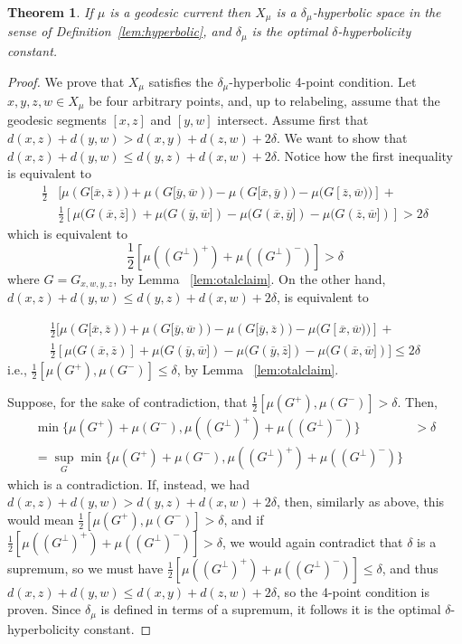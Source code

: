 \documentclass[12pt,article]{amsart}
\numberwithin{equation}{section}
\numberwithin{figure}{section}
\newtheorem{theorem}[equation]{Theorem}
\theoremstyle{definition}
\theoremstyle{plain}
\begin{document}
\begin{theorem}
If $\mu$ is a geodesic current then $X_{\mu}$ is a $\delta_{\mu}$-hyperbolic space in the sense of Definition~\ref{lem:hyperbolic}, and $\delta_{\mu}$ is the optimal $\delta$-hyperbolicity constant.
\label{prop:dualishyp}
\end{theorem}
\begin{proof}
We prove that $X_{\mu}$ satisfies the $\delta_{\mu}$-hyperbolic 4-point condition.
Let $x,y,z,w \in X_{\mu}$ be four arbitrary points, and, up to relabeling, assume that the geodesic segments $[x,z]$ and $[y,w]$ intersect. 
Assume first that $d(x,z) + d(y,w) > d(x,y) + d(z,w)+2\delta$. We want to show that $d(x,z) + d(y,w) \leq d(y,z) + d(x,w)+2\delta$.
Notice how the first inequality is equivalent to 
\begin{align*} 
\frac{1}{2} & [\mu (G[\overline{x},\overline{z})) + \mu(G[\overline{y},\overline{w}))- \mu(G[\overline{x},\overline{y})) - \mu(G[\overline{z},\overline{w})) ] + \\
& \frac{1}{2} [\mu (G(\overline{x},\overline{z}]) + \mu(G(\overline{y},\overline{w}])- \mu(G(\overline{x},\overline{y}]) - \mu(G(\overline{z},\overline{w}]) ] > 2 \delta
\end{align*}
which is equivalent to
\[
\frac{1}{2} [\mu((G^{\perp})^+) + \mu((G^{\perp})^-) ] > \delta
\]
where $G=G_{x,w,y,z}$, by Lemma ~\ref{lem:otalclaim}.
On the other hand, $d(x,z) + d(y,w) \leq d(y,z) + d(x,w)+2\delta$, is equivalent to

\begin{align*}
\frac{1}{2} [ \mu (G[\overline{x},\overline{z})) + \mu(G[\overline{y},\overline{w}))- \mu(G[\overline{y},\overline{z})) - \mu(G[\overline{x},\overline{w})) ] + \\
\frac{1}{2} [ \mu (G(\overline{x},\overline{z})] + \mu(G(\overline{y},\overline{w}])- \mu(G(\overline{y},\overline{z}]) - \mu(G(\overline{x},\overline{w}]) ] \leq  2 \delta
\end{align*}
 i.e., $\frac{1}{2} [ \mu (G^+), \mu (G^-) ] \leq \delta$, by Lemma ~\ref{lem:otalclaim}.

Suppose, for the sake of contradiction, that  $\frac{1}{2} [ \mu (G^+), \mu (G^-) ] >  \delta$. Then, 
\begin{align*}
\min \{ \mu(G^+) + \mu(G^-), \mu((G^{\perp})^+) + \mu((G^{\perp})^-)\} & > \delta \\
= \sup_G \min \{ \mu(G^+) + \mu(G^-), \mu((G^{\perp})^+) + \mu((G^{\perp})^-)\} 
\end{align*}
which is a contradiction.
If, instead, we had $d(x,z) + d(y,w) > d(y,z) + d(x,w)+2\delta$, then, similarly as above, this would mean $\frac{1}{2} [ \mu (G^+), \mu (G^-) ] > \delta$, and if $\frac{1}{2} [\mu((G^{\perp})^+) + \mu((G^{\perp})^-) ]>\delta$, we would again contradict that $\delta$ is a supremum, so we must have $\frac{1}{2} [\mu((G^{\perp})^+) + \mu((G^{\perp})^-) ] \leq \delta$, and thus $d(x,z) + d(y,w) \leq d(x,y) + d(z,w)+2\delta$, so the 4-point condition is proven.
Since $\delta_{\mu}$ is defined in terms of a supremum, it follows it is the optimal $\delta$-hyperbolicity constant.
\end{proof}
\end{document}
